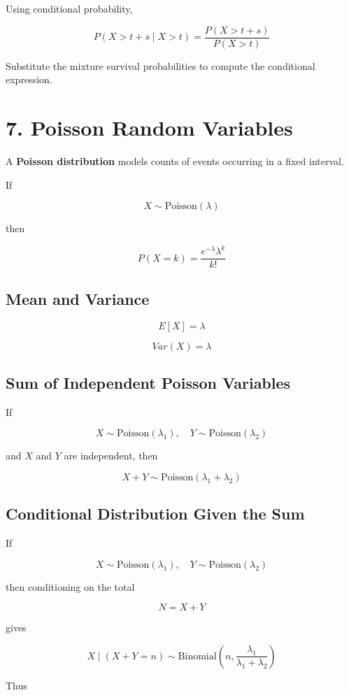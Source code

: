\documentclass[12pt]{article}
\begin{document}
Using conditional probability,

\[
P(X>t+s \mid X>t)
=
\frac{P(X>t+s)}{P(X>t)}
\]

Substitute the mixture survival probabilities to compute the conditional expression.

\section*{7. Poisson Random Variables}

A \textbf{Poisson distribution} models counts of events occurring in a fixed interval.

If

\[
X \sim \text{Poisson}(\lambda)
\]

then

\[
P(X=k)=\frac{e^{-\lambda}\lambda^k}{k!}
\]

\subsection*{Mean and Variance}

\[
E[X]=\lambda
\]

\[
Var(X)=\lambda
\]

\subsection*{Sum of Independent Poisson Variables}

If

\[
X \sim \text{Poisson}(\lambda_1), \quad
Y \sim \text{Poisson}(\lambda_2)
\]

and $X$ and $Y$ are independent, then

\[
X+Y \sim \text{Poisson}(\lambda_1+\lambda_2)
\]

\subsection*{Conditional Distribution Given the Sum}

If

\[
X \sim \text{Poisson}(\lambda_1), \quad
Y \sim \text{Poisson}(\lambda_2)
\]

then conditioning on the total

\[
N=X+Y
\]

gives

\[
X \mid (X+Y=n) \sim \text{Binomial}\left(n,\frac{\lambda_1}{\lambda_1+\lambda_2}\right)
\]

Thus
\end{document}
